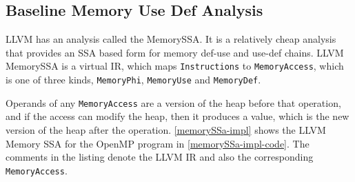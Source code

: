 \subsection{Baseline Memory Use Def Analysis} 
\label{baseline-mem-def-analysis} 
LLVM has an analysis called the MemorySSA\cite{llvm-memoryssa-url}. 
It is a relatively cheap analysis that provides an SSA based form for 
memory def-use and use-def chains. 
LLVM MemorySSA is a virtual IR, which maps \texttt{Instructions} to \texttt{MemoryAccess}, 
which is one of three kinds, \texttt{MemoryPhi}, \texttt{MemoryUse} and 
\texttt{MemoryDef}.

Operands of any \texttt{MemoryAccess} are a version
of the heap before that operation, and if the access can modify 
the heap, then it produces a value, which is the new version of 
the heap after the operation. 
\autoref{memorySSa-impl} shows the LLVM Memory SSA for the OpenMP program
in 
\autoref{memorySSa-impl-code}. 
The comments in the listing denote the LLVM IR and also 
the corresponding \texttt{MemoryAccess}. 

